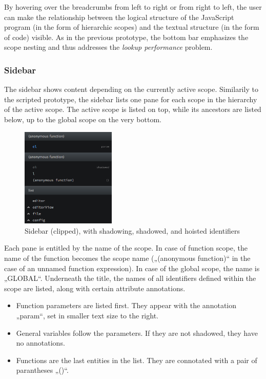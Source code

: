 By hovering over the breadcrumbs from left to right or from right to
left, the user can make the relationship between the logical structure
of the JavaScript program (in the form of hierarchic scopes) and the
textual structure (in the form of code) visible. As in the previous
prototype, the bottom bar emphasizes the scope nesting and thus
addresses the \emph{lookup performance} problem.

\subsubsection{Sidebar}\label{sidebar}

The sidebar shows content depending on the currently active scope.
Similarily to the scripted prototype, the sidebar lists one pane for
each scope in the hierarchy of the active scope. The active scope is
listed on top, while its ancestors are listed below, up to the global
scope on the very bottom.

\begin{figure}[H]
\centering
\includegraphics[keepaspectratio,width=0.4\textwidth]{img/sidebar.png}
\caption{Sidebar (clipped), with shadowing, shadowed, and hoisted identifiers}
\label{fig:protosidebar}
\end{figure}

Each pane is entitled by the name of the scope. In case of function
scope, the name of the function becomes the scope name („(anonymous
function)“ in the case of an unnamed function expression). In case of
the global scope, the name is „GLOBAL“. Underneath the title, the names
of all identifiers defined within the scope are listed, along with
certain attribute annotations.

\begin{itemize}
\itemsep1pt\parskip0pt
\item
  Function parameters are listed first. They appear with the annotation
  „param“, set in smaller text size to the right.
\item
  General variables follow the parameters. If they are not shadowed,
  they have no annotations.
\item
  Functions are the last entities in the list. They are connotated with
  a pair of parantheses „()“.
\end{itemize}

